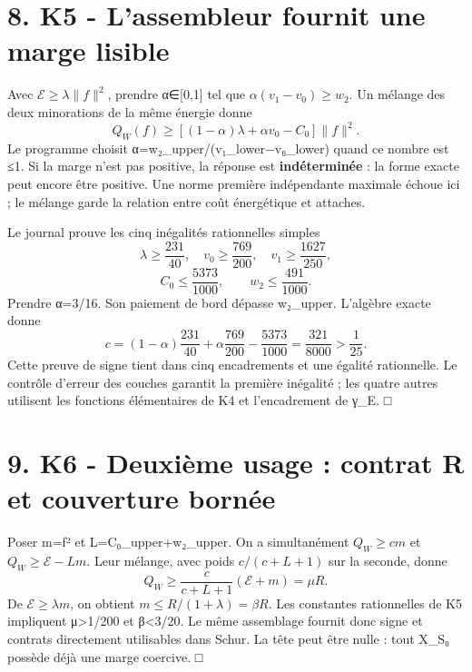 \documentclass[
  10pt,
  a4paper,
]{article}
\begin{document}
\hypertarget{k5---lassembleur-fournit-une-marge-lisible}{%
\section{8. K5 - L'assembleur fournit une marge
lisible}\label{k5---lassembleur-fournit-une-marge-lisible}}

Avec \(\mathcal E\ge\lambda\|f\|^2\), prendre α∈{[}0,1{]} tel que
\(\alpha(v_1-v_0)\ge w_2\). Un mélange des deux minorations de la même
énergie donne \[
Q_W(f)\ge[(1-\alpha)\lambda+\alpha v_0-C_0]\|f\|^2.
\] Le programme choisit α=w₂\_upper/(v₁\_lower−v₀\_lower) quand ce
nombre est ≤1. Si la marge n'est pas positive, la réponse est
\textbf{indéterminée} : la forme exacte peut encore être positive. Une
norme première indépendante maximale échoue ici ; le mélange garde la
relation entre coût énergétique et attaches.

Le journal prouve les cinq inégalités rationnelles simples \[
\lambda\ge\frac{231}{40},\quad v_0\ge\frac{769}{200},
\quad v_1\ge\frac{1627}{250},
\] \[
C_0\le\frac{5373}{1000},\qquad w_2\le\frac{491}{1000}.
\] Prendre α=3/16. Son paiement de bord dépasse w₂\_upper. L'algèbre
exacte donne \[
c=(1-\alpha)\frac{231}{40}+\alpha\frac{769}{200}
-\frac{5373}{1000}=\frac{321}{8000}>\frac1{25}.
\] Cette preuve de signe tient dans cinq encadrements et une égalité
rationnelle. Le contrôle d'erreur des couches garantit la première
inégalité ; les quatre autres utilisent les fonctions élémentaires de K4
et l'encadrement de γ\_E. □

\hypertarget{k6---deuxiuxe8me-usage-contrat-r-et-couverture-bornuxe9e}{%
\section{9. K6 - Deuxième usage : contrat R et couverture
bornée}\label{k6---deuxiuxe8me-usage-contrat-r-et-couverture-bornuxe9e}}

Poser m=\textbar\textbar f\textbar\textbar² et L=C₀\_upper+w₂\_upper. On
a simultanément \(Q_W\ge c m\) et \(Q_W\ge\mathcal E-Lm\). Leur mélange,
avec poids \(c/(c+L+1)\) sur la seconde, donne \[
Q_W\ge\frac{c}{c+L+1}(\mathcal E+m)=\mu R.
\] De \(\mathcal E\ge\lambda m\), on obtient
\(m\le R/(1+\lambda)=\beta R\). Les constantes rationnelles de K5
impliquent μ\textgreater1/200 et β\textless3/20. Le même assemblage
fournit donc signe et contrats directement utilisables dans Schur. La
tête peut être nulle : tout X\_S₀ possède déjà une marge coercive. □
\end{document}
